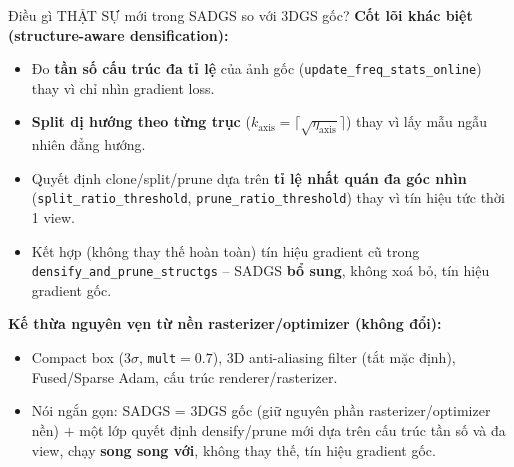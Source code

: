 \begin{frame}{Điều gì THẬT SỰ mới trong SADGS so với 3DGS gốc?}
\footnotesize
\textbf{Cốt lõi khác biệt (structure-aware densification):}
\begin{itemize}
    \item Đo \textbf{tần số cấu trúc đa tỉ lệ} của ảnh gốc (\texttt{update\_freq\_stats\_online}) thay vì chỉ nhìn gradient loss.
    \item \textbf{Split dị hướng theo từng trục} ($k_\text{axis}=\lceil\sqrt{\eta_\text{axis}}\rceil$) thay vì lấy mẫu ngẫu nhiên đẳng hướng.
    \item Quyết định clone/split/prune dựa trên \textbf{tỉ lệ nhất quán đa góc nhìn} (\texttt{split\_ratio\_threshold}, \texttt{prune\_ratio\_threshold}) thay vì tín hiệu tức thời 1 view.
    \item Kết hợp (không thay thế hoàn toàn) tín hiệu gradient cũ trong \texttt{densify\_and\_prune\_structgs} -- SADGS \textbf{bổ sung}, không xoá bỏ, tín hiệu gradient gốc.
\end{itemize}
\vspace{1mm}
\textbf{Kế thừa nguyên vẹn từ nền rasterizer/optimizer (không đổi):}
\begin{itemize}
    \item Compact box ($3\sigma$, \texttt{mult}$=0.7$), 3D anti-aliasing filter (tắt mặc định), Fused/Sparse Adam, cấu trúc renderer/rasterizer.
\end{itemize}
\begin{itemize}
    \item[$\Rightarrow$] Nói ngắn gọn: SADGS = 3DGS gốc (giữ nguyên phần rasterizer/optimizer nền) $+$ một lớp quyết định densify/prune mới dựa trên cấu trúc tần số và đa view, chạy \textbf{song song với}, không thay thế, tín hiệu gradient gốc.
\end{itemize}
\end{frame}


